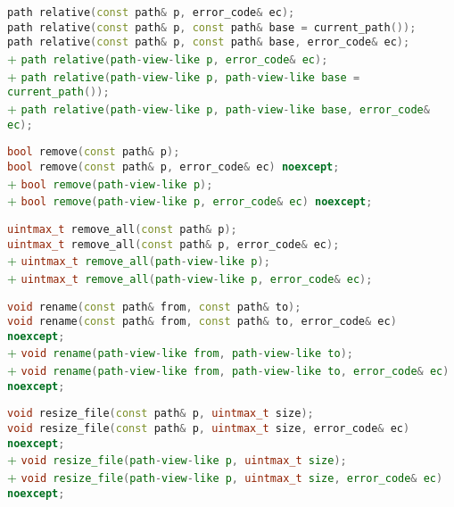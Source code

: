 \documentclass[11pt]{article}
\newcommand{\code}[2][cpp]{\lstinline[language=#1,basicstyle=\small\ttfamily]{#2}}
\newcommand{\tsreplace}[3]{\textcolor{red}{\sout{#1}}#2\textcolor{darkgreen}{#3}}
\begin{document}
\tsreplace{}{  \code{path relative(const path& p, error_code& ec);}}{}\\
\tsreplace{}{  \code{path relative(const path& p, const path& base = current_path());}}{}\\
\tsreplace{}{  \code{path relative(const path& p, const path& base, error_code& ec);}}{}\\
\tsreplace{}{}{+ \code{path relative(path-view-like p, error_code& ec);}}\\
\tsreplace{}{}{+ \code{path relative(path-view-like p, path-view-like base = current_path());}}\\
\tsreplace{}{}{+ \code{path relative(path-view-like p, path-view-like base, error_code& ec);}}

\tsreplace{}{  \code{bool remove(const path& p);}}{}\\
\tsreplace{}{  \code{bool remove(const path& p, error_code& ec) noexcept;}}{}\\
\tsreplace{}{}{+ \code{bool remove(path-view-like p);}}\\
\tsreplace{}{}{+ \code{bool remove(path-view-like p, error_code& ec) noexcept;}}

\tsreplace{}{  \code{uintmax_t remove_all(const path& p);}}{}\\
\tsreplace{}{  \code{uintmax_t remove_all(const path& p, error_code& ec);}}{}\\
\tsreplace{}{}{+ \code{uintmax_t remove_all(path-view-like p);}}\\
\tsreplace{}{}{+ \code{uintmax_t remove_all(path-view-like p, error_code& ec);}}

\tsreplace{}{  \code{void rename(const path& from, const path& to);}}{}\\
\tsreplace{}{  \code{void rename(const path& from, const path& to, error_code& ec) noexcept;}}{}\\
\tsreplace{}{}{+ \code{void rename(path-view-like from, path-view-like to);}}\\
\tsreplace{}{}{+ \code{void rename(path-view-like from, path-view-like to, error_code& ec) noexcept;}}

\tsreplace{}{  \code{void resize_file(const path& p, uintmax_t size);}}{}\\
\tsreplace{}{  \code{void resize_file(const path& p, uintmax_t size, error_code& ec) noexcept;}}{}\\
\tsreplace{}{}{+ \code{void resize_file(path-view-like p, uintmax_t size);}}\\
\tsreplace{}{}{+ \code{void resize_file(path-view-like p, uintmax_t size, error_code& ec) noexcept;}}
\end{document}
